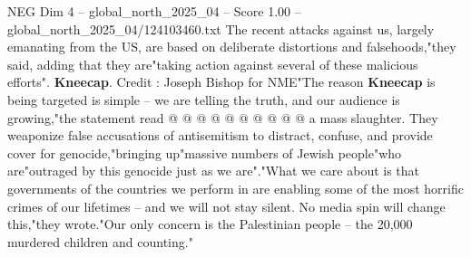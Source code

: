 \begin{textsample}{NEG Dim 4 – global\_north\_2025\_04 – Score 1.00 – global\_north\_2025\_04/124103460.txt}
The recent attacks against us, largely emanating from the US, are based on deliberate distortions and falsehoods,"they said, adding that they are"taking action against several of these malicious efforts". \textbf{Kneecap}.
Credit : Joseph Bishop for NME"The reason \textbf{Kneecap} is being targeted is simple -- we are telling the truth, and our audience is growing,"the statement read @ @ @ @ @ @ @ @ @ @ a mass slaughter.
They weaponize false accusations of antisemitism to distract, confuse, and provide cover for genocide,"bringing up"massive numbers of Jewish people"who are"outraged by this genocide just as we are"."What we care about is that governments of the countries we perform in are enabling some of the most horrific crimes of our lifetimes -- and we will not stay silent.
No media spin will change this,"they wrote."Our only concern is the Palestinian people -- the 20,000 murdered children and counting."

\end{textsample}
